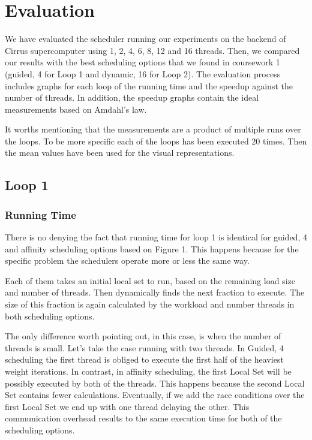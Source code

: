 \documentclass[12pt,a4paper]{article}
\newcommand{\sectionVspacing}{\vspace{15pt}}
\begin{document}
\sectionVspacing

\section{Evaluation}

We have evaluated the scheduler running our experiments on the backend of Cirrus supercomputer using 1, 2, 4, 6, 8, 12 and 16 threads. Then, we compared our results with the best scheduling options that we found in coursework 1 (guided, 4 for Loop 1 and dynamic, 16 for Loop 2). The evaluation process includes graphs for each loop of the running time and the speedup against the number of threads. In addition, the speedup graphs contain the ideal measurements based on Amdahl's law.

It worths mentioning that the measurements are a product of multiple runs over the loops. To be more specific each of the loops has been executed 20 times. Then the mean values have been used for the visual representations.

\subsection{Loop 1}

\subsubsection{Running Time}

There is no denying the fact that running time for loop 1 is identical for guided, 4 and affinity scheduling options based on Figure 1. This happens because for the specific problem the schedulers operate more or less the same way.

Each of them takes an initial local set to run, based on the remaining load size and number of threads. Then dynamically finds the next fraction to execute. The size of this fraction is again calculated by the workload and number threads in both scheduling options.

The only difference worth pointing out, in this case, is when the number of threads is small. Let's take the case running with two threads. In Guided, 4 scheduling the first thread is obliged to execute the first half of the heaviest weight iterations. In contrast, in affinity scheduling, the first Local Set will be possibly executed by both of the threads. This happens because the second Local Set contains fewer calculations. Eventually, if we add the race conditions over the first Local Set we end up with one thread delaying the other. This communication overhead results to the same execution time for both of the scheduling options.
\end{document}

